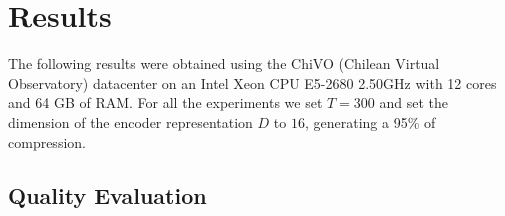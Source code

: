 \section{Results}\label{res}

The following results were obtained using the ChiVO (Chilean Virtual Observatory) datacenter \citep{solar2015chilean} on an Intel Xeon CPU E5-2680 2.50GHz with 12 cores and 64 GB of RAM.
For all the experiments we set $T=300$ and set the dimension of the encoder representation $D$ to $16$,  generating a 95\% of compression.

\subsection{Quality Evaluation} 

